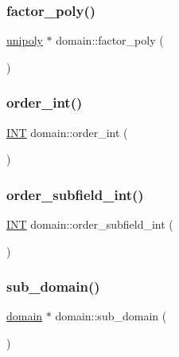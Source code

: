 \subsubsection{\texorpdfstring{factor\+\_\+poly()}{factor\_poly()}}
{\footnotesize\ttfamily \mbox{\hyperlink{classunipoly}{unipoly}} $\ast$ domain\+::factor\+\_\+poly (\begin{DoxyParamCaption}{ }\end{DoxyParamCaption})}

\mbox{\label{classdomain_aa8dcedfd93e3a8db0069a08b9f0bfff7}} 
\subsubsection{\texorpdfstring{order\+\_\+int()}{order\_int()}}
{\footnotesize\ttfamily \mbox{\hyperlink{galois_8h_a09fddde158a3a20bd2dcadb609de11dc}{I\+NT}} domain\+::order\+\_\+int (\begin{DoxyParamCaption}{ }\end{DoxyParamCaption})}

\mbox{\label{classdomain_aca55200b8df1de0873984afa75da5633}} 
\subsubsection{\texorpdfstring{order\+\_\+subfield\+\_\+int()}{order\_subfield\_int()}}
{\footnotesize\ttfamily \mbox{\hyperlink{galois_8h_a09fddde158a3a20bd2dcadb609de11dc}{I\+NT}} domain\+::order\+\_\+subfield\+\_\+int (\begin{DoxyParamCaption}{ }\end{DoxyParamCaption})}

\mbox{\label{classdomain_a07bc19f58d063402df0290c9a9ac8c57}} 
\subsubsection{\texorpdfstring{sub\+\_\+domain()}{sub\_domain()}}
{\footnotesize\ttfamily \mbox{\hyperlink{classdomain}{domain}} $\ast$ domain\+::sub\+\_\+domain (\begin{DoxyParamCaption}{ }\end{DoxyParamCaption})}

